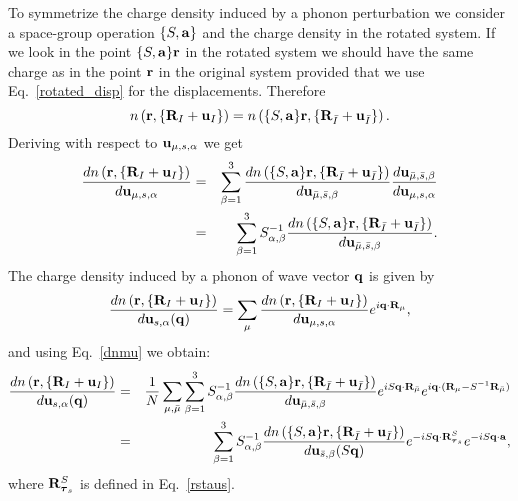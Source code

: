 \documentclass[12pt,a4paper,twoside]{report}
\begin{document}
To symmetrize the charge density induced by a phonon perturbation we consider a space-group operation $\{S,{\bf a}\}$
and the charge density in the rotated system. If
we look in the point $\{S,{\bf a}\} {\bf r}$ in the rotated system we should have the same charge as in the 
point ${\bf r}$ in the original system provided that we use Eq.~\ref{rotated_disp} for the displacements.
Therefore
\begin{equation}
n\left({\bf r}, \{{\bf R}_I + {\bf u}_I\}\right)
=n\left(\{S,{\bf a}\} {\bf r}, \{{\bf R}_{\bar I} + {\bf u}_{\bar I}\}\right).
\end{equation}
Deriving with respect to ${\bf u}_{\mu,s,\alpha}$ we get
\begin{eqnarray}
{d n\left({\bf r}, \{{\bf R}_I + {\bf u}_I\}\right)
\over d {\bf u}_{\mu,s,\alpha}}
&=&\sum_{\beta=1}^3 {d n\left(\{S,{\bf a}\} {\bf r}, \{{\bf R}_{\bar I} + {\bf u}_{\bar I}\}\right)
\over d {\bf u}_{\bar \mu,\bar s,\beta}} {d {\bf u}_{\bar \mu,\bar s,\beta} \over  
d {\bf u}_{\mu,s,\alpha} } \nonumber \\
&=& \sum_{\beta=1}^3 S^{-1}_{\alpha,\beta} {d n\left(\{S,{\bf a}\} {\bf r}, \{{\bf R}_{\bar I} + {\bf u}_{\bar I}\}\right)
\over d {\bf u}_{\bar \mu,\bar s,\beta}}.
\label{dnmu}
\end{eqnarray}
The charge density induced by a phonon of wave vector ${\bf q}$ is given by
\begin{equation}
{d n\left({\bf r}, \{{\bf R}_I + {\bf u}_I\}\right)
\over d {\bf u}_{s,\alpha}({\bf q})} =
\sum_\mu {d n\left({\bf r}, \{{\bf R}_I + {\bf u}_I\}\right)
\over d {\bf u}_{\mu,s,\alpha}} e^{i{\bf q}\cdot {\bf R}_\mu},
\end{equation}
and using Eq.~\ref{dnmu} we obtain:
\begin{eqnarray}
{d n\left({\bf r}, \{{\bf R}_I + {\bf u}_I\}\right)
\over d {\bf u}_{s,\alpha}({\bf q})} &=&
{1\over N}\sum_{\mu,\bar \mu} \sum_{\beta=1}^3 S^{-1}_{\alpha,\beta} {d n\left(\{S,{\bf a}\} {\bf r}, \{{\bf R}_{\bar I} + {\bf u}_{\bar I}\}\right)
\over d {\bf u}_{\bar \mu,\bar s,\beta}}e^{iS{\bf q}\cdot {\bf R}_{\bar \mu} } e^{i{\bf q}\cdot ({\bf R}_\mu - S^{-1}{\bf R}_{\bar \mu}) } \nonumber \\
&=& \sum_{\beta=1}^3 S^{-1}_{\alpha,\beta} {d n\left(\{S,{\bf a}\} {\bf r}, \{{\bf R}_{\bar I} + {\bf u}_{\bar I}\}\right)
\over d {\bf u}_{\bar s,\beta} (S{\bf q})} e^{-iS{\bf q}\cdot {\bf R}^S_{{\boldsymbol{\tau}_s}}} e^{-iS{\bf q}\cdot {\bf a}},
\end{eqnarray}
where ${\bf R}^S_{{\boldsymbol{\tau}_s}}$ is defined in Eq.~\ref{rstaus}. 
\end{document}
